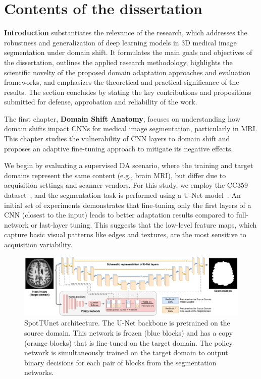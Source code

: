 

\section*{Contents of the dissertation}


\textbf{Introduction} substantiates the relevance of the research, which addresses the robustness and generalization of deep learning models in 3D medical image segmentation under domain shift. It formulates the main goals and objectives of the dissertation, outlines the applied research methodology, highlights the scientific novelty of the proposed domain adaptation approaches and evaluation frameworks, and emphasizes the theoretical and practical significance of the results. The section concludes by stating the key contributions and propositions submitted for defense, approbation and reliability of the work.




The first chapter, \textbf{Domain Shift Anatomy}, focuses on understanding how domain shifts impact CNNs for medical image segmentation, particularly in MRI. This chapter studies the vulnerability of CNN layers to domain shift and proposes an adaptive fine-tuning approach to mitigate its negative effects.

We begin by evaluating a supervised DA scenario, where the training and target domains represent the same content (e.g., brain MRI), but differ due to acquisition settings and scanner vendors. For this study, we employ the CC359 dataset~\cite{cc359}, and the segmentation task is performed using a U-Net model~\cite{unet}. An initial set of experiments demonstrates that fine-tuning only the first layers of a CNN (closest to the input) leads to better adaptation results compared to full-network or last-layer tuning. This suggests that the low-level feature maps, which capture basic visual patterns like edges and textures, are the most sensitive to acquisition variability.

\begin{figure}[!h]
	\centering
	\includegraphics[width=\textwidth]{Dissertation/Figures/2_mri/spottune_seg.pdf}
	\caption{SpotTUnet architecture. The U-Net backbone is pretrained on the source domain. This network is frozen (blue blocks) and has a copy (orange blocks) that is fine-tuned on the target domain. The policy network is simultaneously trained on the target domain to output binary decisions for each pair of blocks from the segmentation networks.}
	\label{fig:spottune_seg}
\end{figure}

